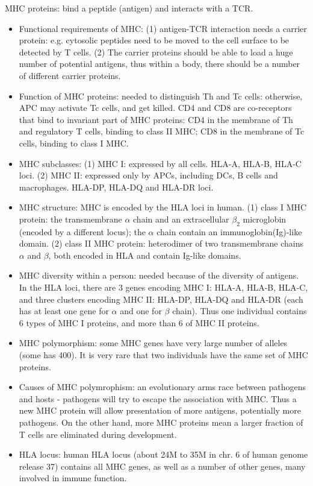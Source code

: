 \documentclass{report}
\begin{document}
MHC proteins: bind a peptide (antigen) and interacts with a TCR. 	
\begin{itemize}
\item Functional requirements of MHC: (1) antigen-TCR interaction needs a carrier protein: e.g. cytosolic peptides need to be moved to the cell surface to be detected by T cells. (2) The carrier proteins should be able to load a huge number of potential antigens, thus within a body, there should be a number of different carrier proteins. 

\item Function of MHC proteins: needed to distinguish Th and Tc cells: otherwise, APC may activate Tc cells, and get killed. CD4 and CD8 are co-receptors that bind to invariant part of MHC proteins: CD4 in the membrane of Th and regulatory T cells, binding to class II MHC; CD8 in the membrane of Tc cells, binding to class I MHC. 

\item MHC subclasses: (1) MHC I: expressed by all cells. HLA-A, HLA-B, HLA-C loci. (2) MHC II: expressed only by APCs, including DCs, B cells and macrophages. HLA-DP, HLA-DQ and HLA-DR loci. 

\item MHC structure: MHC is encoded by the HLA loci in human. (1) class I MHC protein: the transmembrane $\alpha$ chain and an extracellular $\beta_2$ microglobin (encoded by a different locus); the $\alpha$ chain contain an immunoglobin(Ig)-like domain. (2) class II MHC protein: heterodimer of two transmembrane chains $\alpha$ and $\beta$, both encoded in HLA and contain Ig-like domains. 

\item MHC diversity within a person: needed because of the diversity of antigens. In the HLA loci, there are 3 genes encoding MHC I: HLA-A, HLA-B, HLA-C, and three clusters encoding MHC II: HLA-DP, HLA-DQ and HLA-DR (each has at least one gene for $\alpha$ and one for $\beta$ chain). Thus one individual contains 6 types of MHC I proteins, and more than 6 of MHC II proteins. 

\item MHC polymorphism: some MHC genes have very large number of alleles (some has 400). It is very rare that two individuals have the same set of MHC proteins.

\item Causes of MHC polymrophism: an evolutionary arms race between pathogens and hosts - pathogens will try to escape the association with MHC. Thus a new MHC protein will allow presentation of more antigens, potentially more pathogens. On the other hand, more MHC proteins mean a larger fraction of T cells are eliminated during development. 

\item HLA locus: human HLA locus (about 24M to 35M in chr. 6 of human genome release 37) contains all MHC genes, as well as a number of other genes, many involved in immune function. 
\end{itemize}
\end{document}
